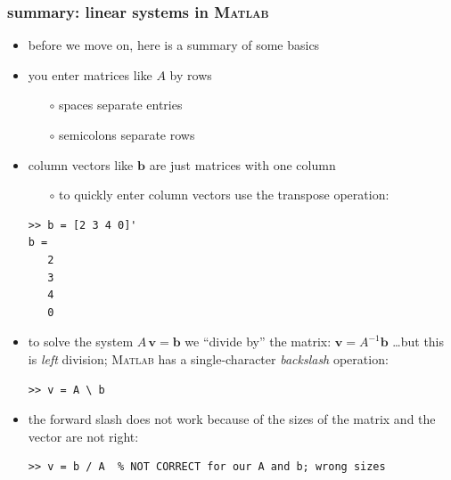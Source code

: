 \documentclass[10pt,hyperref]{beamer}
\newcommand{\bb}{\mathbf{b}}
\newcommand{\bv}{\mathbf{v}}
\newcommand{\Matlab}{\textsc{Matlab}\xspace}
\newcommand{\MO}{\Matlab}
\begin{document}
\begin{frame}[fragile]
\frametitle{summary: linear systems in \MO}

\begin{itemize}
\item before we move on, here is a summary of some basics
\item you enter matrices like $A$ by rows
  \begin{itemize}
  \item[$\circ$] spaces separate entries
  \item[$\circ$] semicolons separate rows
  \end{itemize}
\item column vectors like $\bb$ are just matrices with one column
  \begin{itemize}
  \item[$\circ$] to quickly enter column vectors use the transpose operation:
  \end{itemize}
\begin{Verbatim}[frame=single,fontfamily=courier,fontsize=\scriptsize]
>> b = [2 3 4 0]'
b =
   2
   3
   4
   0
\end{Verbatim}
\item to solve the system $A\, \bv = \bb$ we ``divide by'' the matrix: $\bv = A^{-1} \bb$ \dots but this is \emph{left} division; \MO has a single-character \emph{backslash} operation:
\begin{Verbatim}[frame=single,fontfamily=courier,fontsize=\scriptsize]
>> v = A \ b
\end{Verbatim}

\bigskip
\scriptsize
\item the forward slash does not work because of the sizes of the matrix and the vector are not right:
\begin{Verbatim}[frame=single,fontfamily=courier,fontsize=\scriptsize]
>> v = b / A  % NOT CORRECT for our A and b; wrong sizes
\end{Verbatim}
\end{itemize}
\end{frame}
\end{document}
